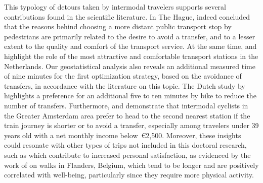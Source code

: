 \begin{refsegment}
This typology of detours taken by intermodal travelers supports several contributions found in the scientific literature. In The Hague, \textcolor{blue}{\textcite[3]{rijsman_walking_2019}} indeed concluded that the reasons behind choosing a more distant public transport stop by pedestrians are primarily related to the desire to avoid a transfer, and to a lesser extent to the quality and comfort of the transport service. At the same time, \textcolor{blue}{\textcite[468]{jonkeren_bicycle-train_2021}} and \textcolor{blue}{\textcite[2144]{krizek_bicycling_2010}} highlight the role of the most attractive and comfortable transport stations in the Netherlands. Our geostatistical analysis also reveals an additional measured time of nine minutes for the first optimization strategy, based on the avoidance of transfers, in accordance with the literature on this topic. The Dutch study by \textcolor{blue}{\textcite[665]{mil_insights_2020}} highlights a preference for an additional five to ten minutes by bike to reduce the number of transfers. Furthermore, \textcolor{blue}{\textcite[143]{kampen_bicycle_2021}} and \textcolor{blue}{\textcite{kampen_understanding_2021}} demonstrate that intermodal cyclists in the Greater Amsterdam area prefer to head to the second nearest station if the train journey is shorter or to avoid a transfer, especially among travelers under 39 years old with a net monthly income below~\euro2,500. Moreover, these insights could resonate with other types of trips not included in this doctoral research, such as  which contribute to increased personal satisfaction, as evidenced by the work of \textcolor{blue}{\textcite[8-9]{hook_undirected_2021}} on walks in Flanders, Belgium, which tend to be longer and are positively correlated with well-being, particularly since they require more physical activity.%


\end{refsegment}
